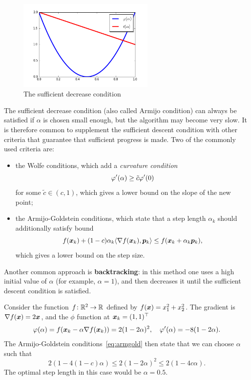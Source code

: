 \begin{figure}[h!]
\centering
\includegraphics[width=0.6\textwidth]{images/armillo.png}
\caption{The sufficient decrease condition}
\end{figure}

The sufficient decrease condition (also called Armijo condition) can always be satisfied if $\alpha$ is chosen small enough, but the algorithm may become very slow. It is therefore common to supplement the sufficient descent condition with other criteria that guarantee that sufficient progress is made. Two of the commonly used criteria are:

\begin{itemize}
\item the Wolfe conditions, which add a {\em curvature condition}
\begin{equation*}
\varphi'(\alpha)\geq \tilde{c} \varphi'(0)
\end{equation*}
for some $\tilde{c}\in (c,1)$, which gives a lower bound on the slope of the new point;
\item the Armijo-Goldstein conditions, which state that a step length $\alpha_k$ should additionally satisfy bound 
\begin{equation}\label{eq:armgold}
  f(\bm{x}_k)+(1-c)\alpha_k \langle {\nabla f(\bm{x}_k)}, {\bm{p}_k} \rangle \leq f(\bm{x}_k+\alpha_k \bm{p}_k),
\end{equation}
which gives a lower bound on the step size.
\end{itemize}

Another common approach is \textbf{backtracking}: in this method one uses a high initial value of $\alpha$ (for example, $\alpha=1$), and then decreases it until the sufficient descent condition is satisfied. 

\begin{example}
 Consider the function $f\colon \mathbb{R}^2\to \mathbb{R}$ defined by $f(\bm{x}) = x_1^2+x_2^2$. The gradient is $\nabla f(\bm{x}) = 2\bm{x}$, and the $\phi$ function at $\bm{x}_k=(1,1)^{\top}$
 \begin{equation*}
  \varphi(\alpha) = f(\bm{x}_k-\alpha \nabla f(\bm{x}_k)) = 2(1-2\alpha)^2, \quad \varphi'(\alpha) = -8(1-2\alpha).
 \end{equation*}
The Armijo-Goldstein conditions~\eqref{eq:armgold} then state that we can choose $\alpha$ such that
\begin{equation*}
 2(1-4(1-c)\alpha) \leq 2(1-2\alpha)^2 \leq 2(1-4c\alpha).
\end{equation*}
The optimal step length in this case would be $\alpha=0.5$.
\end{example}



